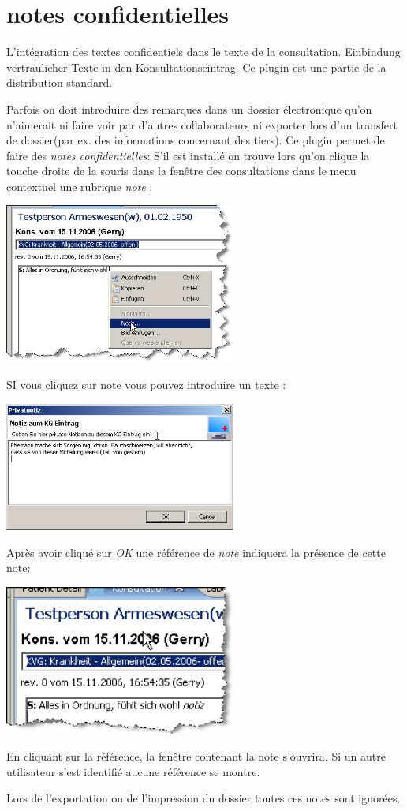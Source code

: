 
\section{notes confidentielles}\label{Privatnotizen}
L'intégration des textes confidentiels dans le texte de la consultation. Einbindung vertraulicher Texte in den Konsultationseintrag. Ce plugin est une partie de la distribution standard.


Parfois on doit introduire des remarques dans un dossier électronique qu'on n'aimerait ni faire voir par d'autres collaborateurs ni exporter lors d'un transfert de dossier(par ex. des informations concernant des tiers). 
Ce plugin permet de faire des \textit{notes confidentielles}: S'il est installé on trouve lors qu'on clique la touche droite de la souris dans la fenêtre des consultations dans le menu contextuel une rubrique \textit{note}  :

\includegraphics[width=3in]{images/notiz1.png}

SI vous cliquez sur note vous pouvez introduire un texte :

\includegraphics[width=3in]{images/notiz2.png}

Après avoir cliqué sur \textit{OK} une référence de \textit{note} indiquera la présence de cette note:

\includegraphics[width=3in]{images/notiz3.png}

En cliquant sur la référence, la fenêtre contenant la note s'ouvrira. Si un autre utilisateur s'est identifié aucune référence se montre.

Lors de l'exportation ou de l'impression du dossier toutes ces notes sont ignorées.


